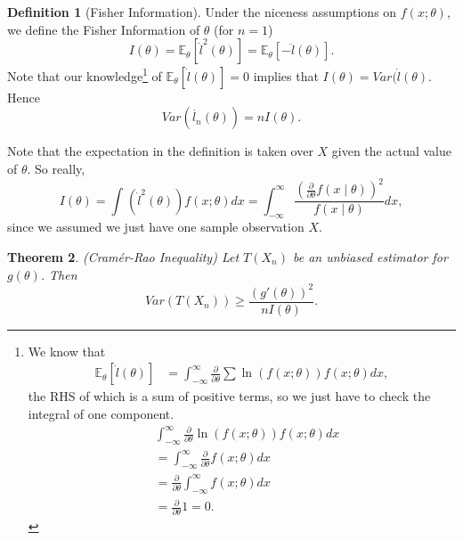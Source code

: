 \documentclass{tufte-handout}
\newcommand*\E{\mathbb{E}}
\newtheorem{thm}{Theorem}[subsection]
\theoremstyle{definition}
\newtheorem{defn}[thm]{Definition}
\begin{document}
\begin{defn}[Fisher Information]
	Under the niceness assumptions on $f(x;\theta)$, we define the Fisher Information of $\theta$ (for $n=1$)\[
		I(\theta) = \E_{\theta}\left[\dot{l}^2(\theta)\right] = \E_\theta\left[-\ddot{l}(\theta)\right] 
	.\] 
	Note that our knowledge\footnote{We know that \begin{align*}
			\E_\theta\left[\dot{l}(\theta)\right] &= \int_{-\infty}^{\infty} \frac{\partial }{\partial \theta} \sum \ln{\left(f(x;\theta)\right)} f(x;\theta)dx
	,\end{align*} the RHS of which is a sum of positive terms, so we just have to check the integral of one component. 
		\begin{align*}
			&\int_{-\infty}^{\infty} \frac{\partial }{\partial \theta} \ln{\left(f(x;\theta)\right)} f(x;\theta)dx \\
			&= \int_{-\infty}^{\infty} \frac{\partial }{\partial \theta} f(x;\theta)dx  \\
			&= \frac{\partial }{\partial \theta} \int_{-\infty}^{\infty} f(x;\theta)dx  \\
			&= \frac{\partial }{\partial \theta} 1 = 0
		.\end{align*}} of $\E_\theta\left[\dot{l}(\theta)\right] = 0$
 implies that $I(\theta) = Var(\dot{l}(\theta)$. Hence \[
		Var(\dot{l_n}(\theta)) = n I (\theta)
	.\] 

	Note that the expectation in the definition is taken over $X$ given the actual value of $\theta$. So really, \[
		I(\theta) = \int_{}^{} \left( \dot{l}^2(\theta) \right) f(x;\theta)dx = \int_{-\infty}^{\infty} \frac{\left( \frac{\partial }{\partial \theta} f(x\mid \theta) \right)^2}{f(x \mid \theta)}dx 
	,\] since we assumed we just have one sample observation $X$.
\end{defn}

\begin{thm}
	(Cram\'er-Rao Inequality) Let $T(X_n)$ be an unbiased estimator for $g(\theta)$. Then \[
		Var\left( T(X_n) \right) \ge \frac{\left( g'(\theta) \right)^2}{n I(\theta)}
	.\] 
\end{thm}
\end{document}
